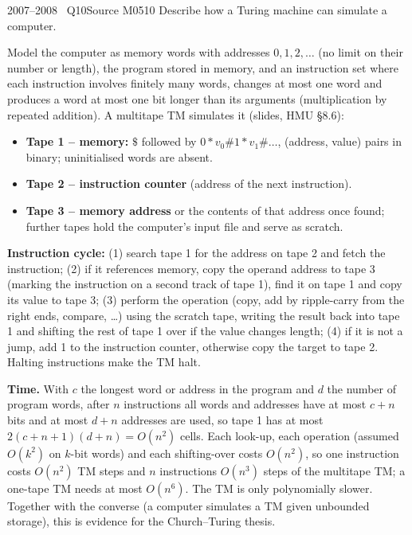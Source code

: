 \documentclass[11pt,a4paper]{article}
\begin{document}
\begin{question}{2007--2008 \textbullet\ Q10}{Source M05}{10}
Describe how a Turing machine can simulate a computer.
\end{question}
\begin{solution}
Model the computer as memory words with addresses $0,1,2,\dots$ (no limit on their number or length), the program stored in memory, and an instruction set where each instruction involves finitely many words, changes at most one word and produces a word at most one bit longer than its arguments (multiplication by repeated addition). A multitape TM simulates it (slides, HMU \S8.6):
\begin{itemize}
\item \textbf{Tape 1 -- memory:} $\$$ followed by $0{*}v_0\#1{*}v_1\#\ldots$, (address, value) pairs in binary; uninitialised words are absent.
\item \textbf{Tape 2 -- instruction counter} (address of the next instruction).
\item \textbf{Tape 3 -- memory address} or the contents of that address once found; further tapes hold the computer's input file and serve as scratch.
\end{itemize}
\textbf{Instruction cycle:} (1) search tape 1 for the address on tape 2 and fetch the instruction; (2) if it references memory, copy the operand address to tape 3 (marking the instruction on a second track of tape 1), find it on tape 1 and copy its value to tape 3; (3) perform the operation (copy, add by ripple-carry from the right ends, compare, \dots) using the scratch tape, writing the result back into tape 1 and shifting the rest of tape 1 over if the value changes length; (4) if it is not a jump, add 1 to the instruction counter, otherwise copy the target to tape 2. Halting instructions make the TM halt.

\textbf{Time.} With $c$ the longest word or address in the program and $d$ the number of program words, after $n$ instructions all words and addresses have at most $c+n$ bits and at most $d+n$ addresses are used, so tape 1 has at most $2(c+n+1)(d+n)=O(n^2)$ cells. Each look-up, each operation (assumed $O(k^2)$ on $k$-bit words) and each shifting-over costs $O(n^2)$, so one instruction costs $O(n^2)$ TM steps and $n$ instructions $O(n^3)$ steps of the multitape TM; a one-tape TM needs at most $O(n^6)$. The TM is only polynomially slower. Together with the converse (a computer simulates a TM given unbounded storage), this is evidence for the Church--Turing thesis.
\end{solution}
\end{document}
